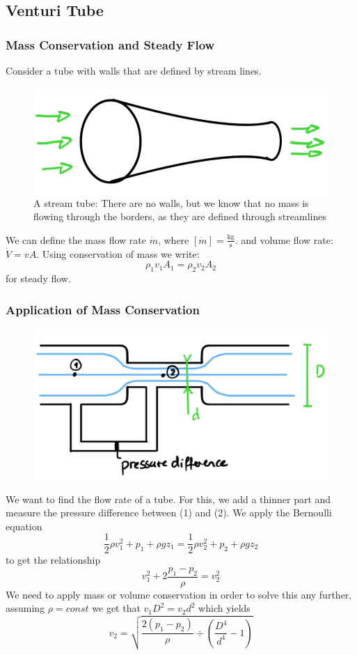 \subsection{Venturi Tube}
\subsubsection{Mass Conservation and Steady Flow}
Consider a tube with walls that are defined by stream lines. 

\begin{figure}[H]
	\centering
	\includegraphics[width=0.4\linewidth]{Sketches/stream_tube}
	\caption{A stream tube: There are no walls, but we know that no mass is flowing through the borders, as they are defined through streamlines}
	\label{fig:streamtube}
\end{figure}

We can define the mass flow rate $\dot m$, where $[\dot m] = \frac{\mathrm{kg}}{\mathrm{s}}$.
and volume flow rate: $\dot V = v A$.
Using conservation of mass we write:
\begin{equation*}
	\rho_1 v_1 A_1 = \rho_2 v_2 A_2
\end{equation*}
for steady flow.

\subsubsection{Application of Mass Conservation}
\begin{figure}[H]
	\centering
	\includegraphics[width=0.7\linewidth]{Sketches/VenturiTube}
	\caption{}
	\label{fig:venturitube}
\end{figure}
We want to find the flow rate of a tube. For this, we add a thinner part and measure the pressure difference between (1) and (2). We apply the Bernoulli equation
\begin{equation*}
	 \frac 12 \rho v_1^2+p_1+\rho gz_1 = \frac 12 \rho v_2^2 + p_2 + \rho gz_2
\end{equation*}
to get the relationship
\begin{equation*}
	v_1^2+ 2 \frac {p_1-p_2}{\rho}=v_2^2
\end{equation*}
We need to apply mass or volume conservation in order to solve this any further, assuming  $\rho  = const$ we get that $v_1D^2 = v_2d^2$ which yields
\begin{equation*}
	v_2 = \sqrt{\frac{2(p_1-p_2)}\rho\div \left(\frac{D^4}{d^4}-1\right)}
\end{equation*}


